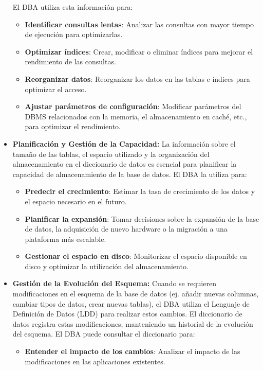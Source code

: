 \begin{itemize}
\begin{itemize}
    \end{itemize}
    El DBA utiliza esta información para:
    \begin{itemize}
        \item \textbf{Identificar consultas lentas}: Analizar las consultas con mayor tiempo de ejecución para optimizarlas.
        \item \textbf{Optimizar índices}: Crear, modificar o eliminar índices para mejorar el rendimiento de las consultas.
        \item \textbf{Reorganizar datos}: Reorganizar los datos en las tablas e índices para optimizar el acceso.
        \item \textbf{Ajustar parámetros de configuración}: Modificar parámetros del DBMS relacionados con la memoria, el almacenamiento en caché, etc., para optimizar el rendimiento.
    \end{itemize}
    \item \textbf{Planificación y Gestión de la Capacidad:} La información sobre el tamaño de las tablas, el espacio utilizado y la organización del almacenamiento en el diccionario de datos es esencial para planificar la capacidad de almacenamiento de la base de datos. El DBA la utiliza para:
    \begin{itemize}
        \item \textbf{Predecir el crecimiento}: Estimar la tasa de crecimiento de los datos y el espacio necesario en el futuro.
        \item \textbf{Planificar la expansión}: Tomar decisiones sobre la expansión de la base de datos, la adquisición de nuevo hardware o la migración a una plataforma más escalable.
        \item \textbf{Gestionar el espacio en disco}: Monitorizar el espacio disponible en disco y optimizar la utilización del almacenamiento.
    \end{itemize}
    \item \textbf{Gestión de la Evolución del Esquema:} Cuando se requieren modificaciones en el esquema de la base de datos (ej. añadir nuevas columnas, cambiar tipos de datos, crear nuevas tablas), el DBA utiliza el Lenguaje de Definición de Datos (LDD) para realizar estos cambios. El diccionario de datos registra estas modificaciones, manteniendo un historial de la evolución del esquema. El DBA puede consultar el diccionario para:
    \begin{itemize}
        \item \textbf{Entender el impacto de los cambios}: Analizar el impacto de las modificaciones en las aplicaciones existentes.

\end{itemize}
\end{itemize}
